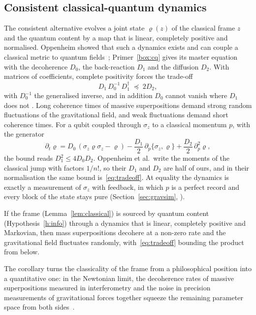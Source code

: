 
\subsection{Consistent classical-quantum dynamics}

The consistent alternative evolves a joint state $\varrho(z)$ of the classical frame $z$ and the quantum content by a map that is linear,
completely positive and normalised. Oppenheim showed that such a dynamics exists and can couple a classical metric to quantum
fields~\cite{oppenheim}; Primer~\ref{box:cq} gives its master equation with the decoherence $D_0$, the back-reaction $D_1$ and the diffusion
$D_2$. With matrices of coefficients, complete positivity forces the trade-off~\cite[Eq.~(23)]{osswd}
\begin{equation}\label{eq:tradeoff}
D_1\,D_0^{-1}\,D_1^{\dagger}\;\preceq\;2D_2 ,
\end{equation}
with $D_0^{-1}$ the generalised inverse, and in addition $D_0$ cannot vanish where $D_1$ does not \tagP. Long coherence times of massive superpositions demand strong random fluctuations of the
gravitational field, and weak fluctuations demand short coherence times. For a qubit coupled through $\sigma_z$ to a classical momentum
$p$, with the generator
\begin{equation}\label{eq:cqqubit}
\partial_t\varrho=D_0\,(\sigma_z\varrho\sigma_z-\varrho)-\frac{D_1}{2}\,\partial_p\{\sigma_z,\varrho\}+\frac{D_2}{2}\,\partial_p^2\varrho,
\end{equation}
the bound reads $D_1^2\le4D_0D_2$. Oppenheim et al.\ write the moments of the classical jump with factors $1/n!$, so their $D_1$ and $D_2$
are half of ours, and in their normalisation the same bound is~\eqref{eq:tradeoff}. At equality the dynamics is exactly a measurement of
$\sigma_z$ with feedback, in which $p$ is a perfect record and every block of the state stays pure (Section~\ref{sec:gravsim},
).

\begin{corollary}\label{co:diffuse}
If the frame (Lemma~\ref{lem:classical}) is sourced by quantum content (Hypothesis~\ref{h:info}) through a dynamics that is linear,
completely positive and Markovian, then mass superpositions decohere at a non-zero rate and the gravitational field fluctuates randomly,
with~\eqref{eq:tradeoff} bounding the product from below.
\end{corollary}

The corollary turns the classicality of the frame from a philosophical position into a quantitative one: in the Newtonian limit, the
decoherence rates of massive superpositions measured in interferometry and the noise in precision measurements of gravitational forces
together squeeze the remaining parameter space from both sides~\cite{osswd}.

